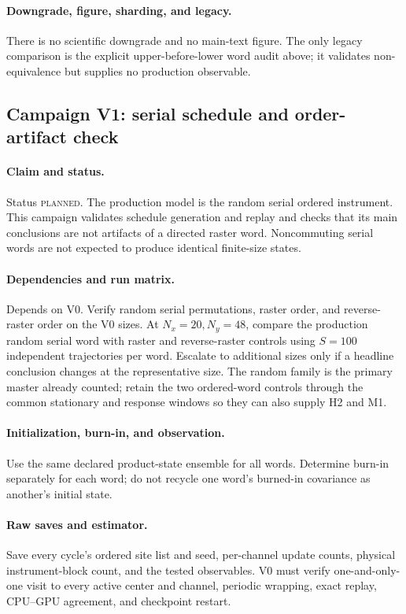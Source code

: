 \documentclass[aps,prx,onecolumn,nofootinbib,superscriptaddress,longbibliography]{revtex4-2}
\newcommand{\planned}{\textsc{planned}}
\begin{document}
\paragraph{Downgrade, figure, sharding, and legacy.}
There is no scientific downgrade and no main-text figure.  The only legacy comparison is
the explicit upper-before-lower word audit above; it validates non-equivalence but supplies
no production observable.

\subsection{Campaign V1: serial schedule and order-artifact check}
\paragraph{Claim and status.}
Status \planned.  The production model is the random serial ordered instrument.  This
campaign validates schedule generation and replay and checks that its main conclusions are
not artifacts of a directed raster word.  Noncommuting serial words are not expected to
produce identical finite-size states.

\paragraph{Dependencies and run matrix.}
Depends on V0.  Verify random serial permutations, raster order, and reverse-raster order
on the V0 sizes.  At $N_x=20,N_y=48$, compare the production random serial word with raster
and reverse-raster controls using $S=100$ independent trajectories per word.  Escalate to
additional sizes only if a headline conclusion changes at the representative size.  The
random family is the primary master already counted; retain the two ordered-word controls
through the common stationary and response windows so they can also supply H2 and M1.

\paragraph{Initialization, burn-in, and observation.}
Use the same declared product-state ensemble for all words.  Determine burn-in separately
for each word; do not recycle one word's burned-in covariance as another's initial state.

\paragraph{Raw saves and estimator.}
Save every cycle's ordered site list and seed, per-channel update counts, physical
instrument-block count, and the tested observables.  V0 must verify one-and-only-one visit
to every active center and channel, periodic wrapping, exact replay, CPU--GPU agreement,
and checkpoint restart.
\end{document}
